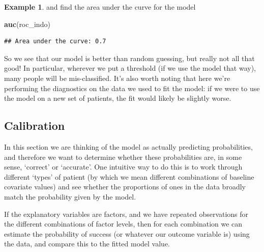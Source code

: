 \documentclass[
  openany]{book}
\newenvironment{Shaded}{\begin{snugshade}}{\end{snugshade}}
\newcommand{\FunctionTok}[1]{\textcolor[rgb]{0.13,0.29,0.53}{\textbf{#1}}}
\newcommand{\NormalTok}[1]{#1}
\theoremstyle{definition}
\theoremstyle{definition}
\newtheorem{example}{Example}[chapter]
\theoremstyle{definition}
\theoremstyle{definition}
\theoremstyle{remark}
\begin{document}
\begin{example}
and find the area under the curve for the model

\begin{Shaded}
\begin{Highlighting}[]
\FunctionTok{auc}\NormalTok{(roc\_indo)}
\end{Highlighting}
\end{Shaded}

\begin{verbatim}
## Area under the curve: 0.7
\end{verbatim}

So we see that our model is better than random guessing, but really not all that good! In particular, wherever we put a threshold (if we use the model that way), many people will be mis-classified. It's also worth noting that here we're performing the diagnostics on the data we used to fit the model: if we were to use the model on a new set of patients, the fit would likely be slightly worse.
\end{example}

\subsection{Calibration}\label{calibration}

In this section we are thinking of the model as actually predicting probabilities, and therefore we want to determine whether these probabilities are, in some sense, `correct' or `accurate'. One intuitive way to do this is to work through different `types' of patient (by which we mean different combinations of baseline covariate values) and see whether the proportions of ones in the data broadly match the probability given by the model.

If the explanatory variables are factors, and we have repeated observations for the different combinations of factor levels, then for each combination we can estimate the probability of success (or whatever our outcome variable is) using the data, and compare this to the fitted model value.
\end{document}
